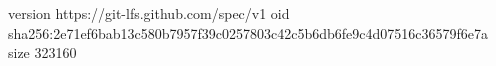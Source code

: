 version https://git-lfs.github.com/spec/v1
oid sha256:2e71ef6bab13c580b7957f39c0257803c42c5b6db6fe9c4d07516c36579f6e7a
size 323160

